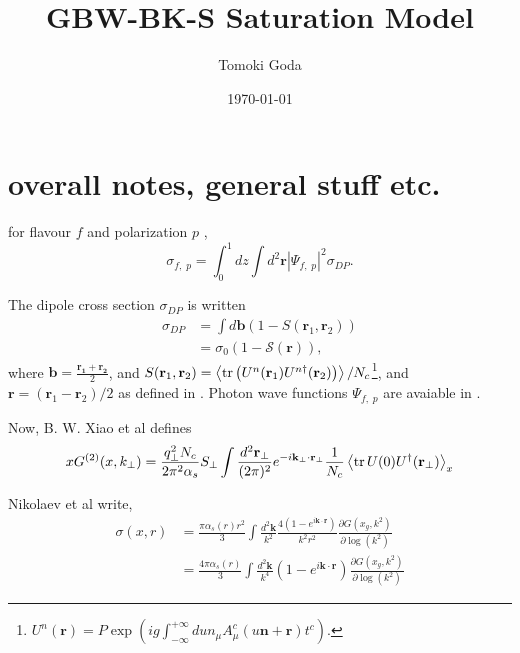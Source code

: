 \documentclass[12pt]{article}
\begin{document}
	
\author{Tomoki Goda}
\title{GBW-BK-S Saturation Model}
\date{\today}

\maketitle
	
{}


\section{overall notes, general stuff etc.}

for flavour $f$ and polarization $p$ \cite{cambqcd}\cite{gbw1998},
\begin{equation}
	\sigma_{f,\;p}=\int_{0}^{1} d z \int d^2\mathbf{r}|\Psi_{f,\;p}|^2 \sigma_{DP}.
\end{equation}

The dipole cross section $\sigma_{DP}$ is written \cite{cambqcd}%
\begin{align}
	\sigma_{DP}&=\int d\mathbf{b}(1-S(\mathbf{r}_1,\mathbf{r}_2)) \\
	&=\sigma_0 (1-\mathcal{S}(\mathbf{r})),
\end{align}
where $\mathbf{b}=\frac{\mathbf{r_1}+\mathbf{r_2}}{2}$, and $S(\mathbf{r}_1,\mathbf{r}_2) =\expval{\tr\left( U^n(\mathbf{r}_1) U^{n\dagger}(\mathbf{r}_2)\right)}/N_c$\footnote{$U ^n (\mathbf{r})=P \exp\left(i g \int^{+\infty}_{-\infty}du n_\mu A^c_\mu (u \mathbf{n}+\mathbf{r}) t^c\right)$. %
}, and $ \mathbf{r}=(\mathbf{r}_1-\mathbf{r}_2)/2 $ as defined in \cite{cambqcd}.
\newline
Photon wave functions $\Psi_{f,\;p}$ are avaiable in \cite{gbw1998} \cite{nikolaev1994}.

Now, B. W. Xiao et al \cite{xiao2017} defines 
\begin{equation}
x G^{(2)}(x, k_\perp)=\frac{q_\perp^2 N_c}{2 \pi^2 \alpha_s} S_\perp \int \frac{d^2\mathbf{r}_\perp}{(2\pi)^2} e^{-i \mathbf{k}_\perp\cdot \mathbf{r}_\perp}\frac{1}{N_c}\expval{\tr U(0)U^\dagger(\mathbf{r}_\perp)}_x
\end{equation}

Nikolaev et al write\cite{nikolaev1994},
\begin{align}
\sigma(x,r)&=\frac{\pi \alpha_s(r) r^2}{3}\int\frac{d^2 \mathbf{k}}{k^2}\frac{4\left(1-e^{i\mathbf{k}\cdot\mathbf{r}}\right)}{k^2 r^2}\frac{\partial G(x_g,k^2)}{\partial \log(k^2)}\\
&=\frac{4 \pi \alpha_s(r) }{3}\int\frac{d^2 \mathbf{k}}{k^4}\left(1-e^{i\mathbf{k}\cdot\mathbf{r}}\right) \frac{\partial G(x_g,k^2)}{\partial \log(k^2)}
\label{eq:niktot}
\end{align}
\end{document}
